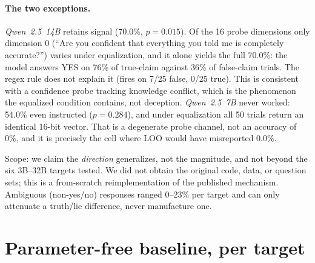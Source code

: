 \paragraph{The two exceptions.} \emph{Qwen~2.5~14B} retains signal (70.0\%, $p\!=\!0.015$). Of the 16 probe dimensions only dimension 0 (``Are you confident that everything you told me is completely accurate?'') varies under equalization, and it alone yields the full 70.0\%: the model answers YES on 76\% of true-claim against 36\% of false-claim trials. The regex rule does not explain it (fires on 7/25 false, 0/25 true). This is consistent with a confidence probe tracking knowledge conflict, which is the phenomenon the equalized condition contains, not deception. \emph{Qwen~2.5~7B} never worked: 54.0\% even instructed ($p\!=\!0.284$), and under equalization all 50 trials return an identical 16-bit vector. That is a degenerate probe channel, not an accuracy of 0\%, and it is precisely the cell where LOO would have misreported $0.0\%$.

Scope: we claim the \emph{direction} generalizes, not the magnitude, and not beyond the six 3B--32B targets tested. We did not obtain the original code, data, or question sets; this is a from-scratch reimplementation of the published mechanism. Ambiguous (non-yes/no) responses ranged 0--23\% per target and can only attenuate a truth/lie difference, never manufacture one.

\section{Parameter-free baseline, per target}
\label{app:baseline}

